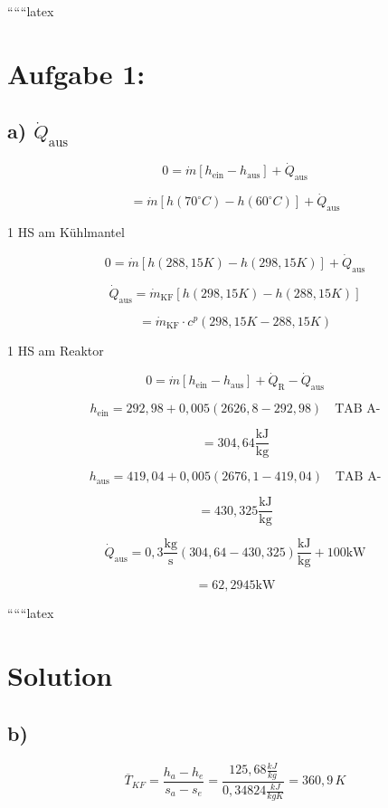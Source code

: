 
``````latex


\section*{Aufgabe 1:}

\subsection*{a) $\dot{Q}_{\text{aus}}$}

\[
0 = \dot{m} \left[ h_{\text{ein}} - h_{\text{aus}} \right] + \dot{Q}_{\text{aus}}
\]

\[
= \dot{m} \left[ h(70^\circ C) - h(60^\circ C) \right] + \dot{Q}_{\text{aus}}
\]

1 HS am Kühlmantel

\[
0 = \dot{m} \left[ h(288,15K) - h(298,15K) \right] + \dot{Q}_{\text{aus}}
\]

\[
\dot{Q}_{\text{aus}} = \dot{m}_{\text{KF}} \left[ h(298,15K) - h(288,15K) \right]
\]

\[
= \dot{m}_{\text{KF}} \cdot c^p \left( 298,15K - 288,15K \right)
\]

1 HS am Reaktor

\[
0 = \dot{m} \left[ h_{\text{ein}} - h_{\text{aus}} \right] + \dot{Q}_{\text{R}} - \dot{Q}_{\text{aus}}
\]

\[
h_{\text{ein}} = 292,98 + 0,005 \left( 2626,8 - 292,98 \right) \quad \text{TAB A-}
\]

\[
= 304,64 \frac{\text{kJ}}{\text{kg}}
\]

\[
h_{\text{aus}} = 419,04 + 0,005 \left( 2676,1 - 419,04 \right) \quad \text{TAB A-}
\]

\[
= 430,325 \frac{\text{kJ}}{\text{kg}}
\]

\[
\dot{Q}_{\text{aus}} = 0,3 \frac{\text{kg}}{\text{s}} \left( 304,64 - 430,325 \right) \frac{\text{kJ}}{\text{kg}} + 100 \text{kW}
\]

\[
= 62,2945 \text{kW}
\]

``````latex

\section*{Solution}

\subsection*{b)}

\[
\overline{T}_{KF} = \frac{h_a - h_e}{s_a - s_e} = \frac{125,68 \frac{kJ}{kg}}{0,34824 \frac{kJ}{kgK}} = \boxed{360,9 \, K}
\]

